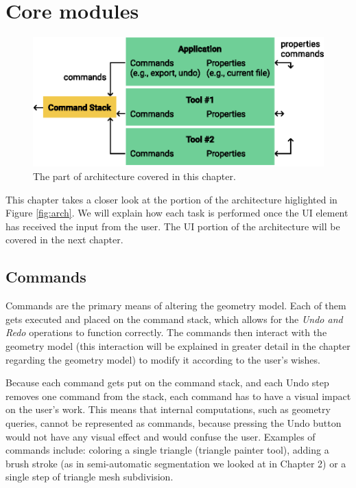 \chapter{Core modules}

\begin{figure}[b]
	\centering
	\includegraphics[scale=0.9]{images/architecture_commandstack}
	\caption{The part of architecture covered in this chapter.}
	\label{fig:architecture_commandstack}
\end{figure}

This chapter takes a closer look at the portion of the architecture higlighted in Figure \ref{fig:arch}. We will explain how each task is performed once the UI element has received the input from the user. The UI portion of the architecture will be covered in the next chapter.


\section{Commands}
Commands are the primary means of altering the geometry model. Each of them gets executed and placed on the command stack, which allows for the \textit{Undo and Redo} operations to function correctly. The commands then interact with the geometry model (this interaction will be explained in greater detail in the chapter regarding the geometry model) to modify it according to the user's wishes.

Because each command gets put on the command stack, and each Undo step removes one command from the stack, each command has to have a visual impact on the user's work. This means that internal computations, such as geometry queries, cannot be represented as commands, because pressing the Undo button would not have any visual effect and would confuse the user. Examples of commands include: coloring a single triangle (triangle painter tool), adding a brush stroke (as in semi-automatic segmentation we looked at in Chapter 2) or a single step of triangle mesh subdivision.

